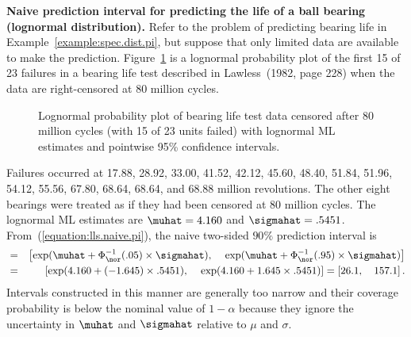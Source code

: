 \begin{example}
\label{example:naive.ln.pi}
{\bf Naive prediction interval for predicting the life of a ball
bearing (lognormal distribution).}  Refer to the problem of
predicting bearing life in Example~\ref{example:spec.dist.pi}, but
suppose that only limited data are available to make the prediction.
Figure~\ref{figure:lzb5.mleprobpolt.lognor.ps} is a lognormal
probability plot of the first 15 of 23 failures in a bearing life
test described in Lawless~(1982, page 228) when the data are
right-censored at 80 million cycles.
\begin{figure}
\caption{Lognormal probability plot
of bearing life test data censored after 80 million cycles (with 15 of
23 units failed) with lognormal ML estimates and pointwise 95\%
confidence intervals.}
\label{figure:lzb5.mleprobpolt.lognor.ps}
\end{figure}
Failures occurred at 17.88, 28.92, 33.00,
41.52, 42.12, 45.60, 48.40, 51.84, 51.96, 54.12, 55.56, 67.80, 68.64,
68.64, and 68.88 million revolutions. The other eight bearings were treated as if 
they had been censored at 80 million cycles.
The lognormal ML estimates are $\muhat=4.160$ and $\sigmahat=.5451$.
From~(\ref{equation:lls.naive.pi}), the naive two-sided $90\%$
prediction interval is
\begin{eqnarray}
        [ \Tlower, \quad \Tupper ] &=&
\label{equation:naive.pi}
\left [ \exp(\muhat + \Phi_{\nor}^{-1}(.05) \times \sigmahat), \, 
\quad\exp( \muhat + \Phi_{\nor}^{-1}(.95)  \times \sigmahat)
\right ] \\
 &=&
\left [ \exp(4.160 + (-1.645) \times .5451), \,
	\quad \exp(4.160 + 1.645 \times .5451)
	\right ] =  \left [26.1, \quad 157.1  \right]. \nonumber
\end{eqnarray}
Intervals constructed in this manner are generally too narrow and their
coverage probability is below the nominal value of $1-\alpha$ because
they ignore the uncertainty in $\muhat$ and $\sigmahat$ relative to
$\mu$ and $\sigma$.
\end{example}


